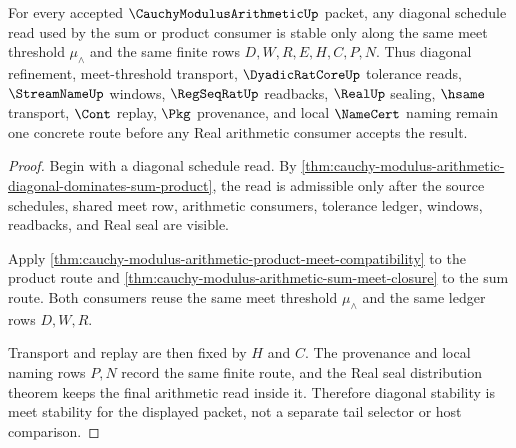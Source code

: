 \begin{theorem}
\label{thm:cauchy-modulus-arithmetic-diagonal-meet-stability}
For every accepted $\CauchyModulusArithmeticUp$ packet, any diagonal schedule read used by the sum or product consumer is stable only along the same meet threshold $\mu_{\wedge}$ and the same finite rows $D,W,R,E,H,C,P,N$. Thus diagonal refinement, meet-threshold transport, $\DyadicRatCoreUp$ tolerance reads, $\StreamNameUp$ windows, $\RegSeqRatUp$ readbacks, $\RealUp$ sealing, $\hsame$ transport, $\Cont$ replay, $\Pkg$ provenance, and local $\NameCert$ naming remain one concrete route before any Real arithmetic consumer accepts the result.
\end{theorem}
\begin{proof}
Begin with a diagonal schedule read. By \autoref{thm:cauchy-modulus-arithmetic-diagonal-dominates-sum-product}, the read is admissible only after the source schedules, shared meet row, arithmetic consumers, tolerance ledger, windows, readbacks, and Real seal are visible.

Apply \autoref{thm:cauchy-modulus-arithmetic-product-meet-compatibility} to the product route and \autoref{thm:cauchy-modulus-arithmetic-sum-meet-closure} to the sum route. Both consumers reuse the same meet threshold $\mu_{\wedge}$ and the same ledger rows $D,W,R$.

Transport and replay are then fixed by $H$ and $C$. The provenance and local naming rows $P,N$ record the same finite route, and the Real seal distribution theorem keeps the final arithmetic read inside it. Therefore diagonal stability is meet stability for the displayed packet, not a separate tail selector or host comparison.
\end{proof}


